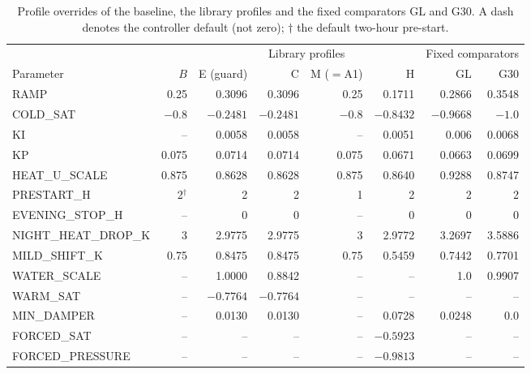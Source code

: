 \begin{table}[!htbp]
\centering
\caption{Profile overrides of the baseline, the library profiles and the fixed comparators GL and G30. A dash denotes the
controller default (not zero); $\dagger$ the default two-hour pre-start.}
\label{tab:profiles}
\small
\setlength{\tabcolsep}{4.5pt}
\begin{tabular}{lrrrrrrr}
\toprule
 & & \multicolumn{4}{c}{Library profiles} & \multicolumn{2}{c}{Fixed comparators}\\
\cmidrule(lr){3-6}\cmidrule(lr){7-8}
Parameter & $B$ & E (guard) & C & M ($=$A1) & H & GL & G30\\
\midrule
RAMP                & 0.25    & 0.3096   & 0.3096   & 0.25  & 0.1711    & 0.2866    & 0.3548\\
COLD\_SAT           & $-0.8$  & $-0.2481$ & $-0.2481$ & $-0.8$ & $-0.8432$ & $-0.9668$ & $-1.0$\\
KI                  & --      & 0.0058   & 0.0058   & --    & 0.0051    & 0.006     & 0.0068\\
KP                  & 0.075   & 0.0714   & 0.0714   & 0.075 & 0.0671    & 0.0663    & 0.0699\\
HEAT\_U\_SCALE      & 0.875   & 0.8628   & 0.8628   & 0.875 & 0.8640    & 0.9288    & 0.8747\\
PRESTART\_H         & 2$^\dagger$ & 2    & 2        & 1     & 2         & 2         & 2\\
EVENING\_STOP\_H    & --      & 0        & 0        & --    & 0         & 0         & 0\\
NIGHT\_HEAT\_DROP\_K & 3      & 2.9775   & 2.9775   & 3     & 2.9772    & 3.2697    & 3.5886\\
MILD\_SHIFT\_K      & 0.75    & 0.8475   & 0.8475   & 0.75  & 0.5459    & 0.7442    & 0.7701\\
WATER\_SCALE        & --      & 1.0000   & 0.8842   & --    & --        & 1.0       & 0.9907\\
WARM\_SAT           & --      & $-0.7764$ & $-0.7764$ & --   & --        & --        & --\\
MIN\_DAMPER         & --      & 0.0130   & 0.0130   & --    & 0.0728    & 0.0248    & 0.0\\
FORCED\_SAT         & --      & --       & --       & --    & $-0.5923$ & --        & --\\
FORCED\_PRESSURE    & --      & --       & --       & --    & $-0.9813$ & --        & --\\
\bottomrule
\end{tabular}
\end{table}

